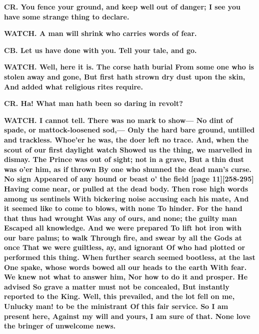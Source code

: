 \documentclass[11pt,letter]{book}
\begin{document}
\par \textbf{CR. You fence your ground, and keep well out of danger; I see you have some strange thing to declare.}
\par 

\par \textbf{WATCH. A man will shrink who carries words of fear.}
\par 

\par \textbf{CB. Let us have done with you. Tell your tale, and go.}
\par 

\par \textbf{WATCH. Well, here it is. The corse hath burial From some one who is stolen away and gone, But first hath strown dry dust upon the skin, And added what religious rites require.}
\par 

\par \textbf{CR. Ha! What man hath been so daring in revolt?}
\par 

\par \textbf{WATCH. I cannot tell. There was no mark to show— No dint of spade, or mattock-loosened sod,— Only the hard bare ground, untilled and trackless. Whoe’er he was, the doer left no trace. And, when the scout of our first daylight watch Showed us the thing, we marvelled in dismay. The Prince was out of sight; not in a grave, But a thin dust was o’er him, as if thrown By one who shunned the dead man’s curse. No sign Appeared of any hound or beast o’ the field [page 11][258-295] Having come near, or pulled at the dead body. Then rose high words among us sentinels With bickering noise accusing each his mate, And it seemed like to come to blows, with none To hinder. For the hand that thus had wrought Was any of ours, and none; the guilty man Escaped all knowledge. And we were prepared To lift hot iron with our bare palms; to walk Through fire, and swear by all the Gods at once That we were guiltless, ay, and ignorant Of who had plotted or performed this thing. When further search seemed bootless, at the last One spake, whose words bowed all our heads to the earth With fear. We knew not what to answer him, Nor how to do it and prosper. He advised So grave a matter must not be concealed, But instantly reported to the King. Well, this prevailed, and the lot fell on me, Unlucky man! to be the ministrant Of this fair service. So I am present here, Against my will and yours, I am sure of that. None love the bringer of unwelcome news.}
\par 
\end{document}
